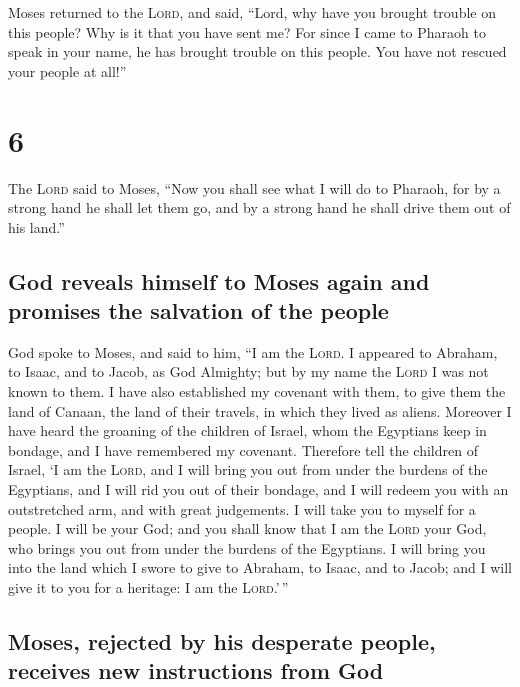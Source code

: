  Moses returned to the \textsc{Lord}, and said, ``Lord,
why have you brought trouble on this people? Why is it that you have
sent me?  For since I came to Pharaoh to speak in your
name, he has brought trouble on this people. You have not rescued your
people at all!''

\hypertarget{section-5}{%
\section{6}\label{section-5}}

 The \textsc{Lord} said to Moses, ``Now you shall see what
I will do to Pharaoh, for by a strong hand he shall let them go, and by
a strong hand he shall drive them out of his land.''

\hypertarget{god-reveals-himself-to-moses-again-and-promises-the-salvation-of-the-people}{%
\subsection{God reveals himself to Moses again and promises the
salvation of the
people}\label{god-reveals-himself-to-moses-again-and-promises-the-salvation-of-the-people}}

 God spoke to Moses, and said to him, ``I am the
\textsc{Lord}.  I appeared to Abraham, to Isaac, and to
Jacob, as God Almighty; but by my name the \textsc{Lord} I was not known
to them.  I have also established my covenant with them,
to give them the land of Canaan, the land of their travels, in which
they lived as aliens.  Moreover I have heard the groaning
of the children of Israel, whom the Egyptians keep in bondage, and I
have remembered my covenant.  Therefore tell the children
of Israel, `I am the \textsc{Lord}, and I will bring you out from under
the burdens of the Egyptians, and I will rid you out of their bondage,
and I will redeem you with an outstretched arm, and with great
judgements.  I will take you to myself for a people. I
will be your God; and you shall know that I am the \textsc{Lord} your
God, who brings you out from under the burdens of the Egyptians.
 I will bring you into the land which I swore to give to
Abraham, to Isaac, and to Jacob; and I will give it to you for a
heritage: I am the \textsc{Lord}.'\,''

\hypertarget{moses-rejected-by-his-desperate-people-receives-new-instructions-from-god}{%
\subsection{Moses, rejected by his desperate people, receives new
instructions from
God}\label{moses-rejected-by-his-desperate-people-receives-new-instructions-from-god}}

